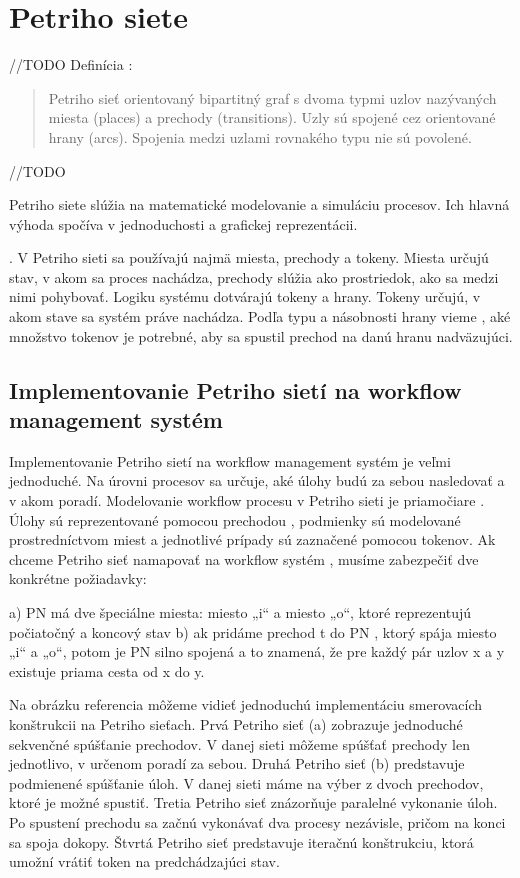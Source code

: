 \section{Petriho siete}

//TODO
Definícia \cite{workflow_systemy} :
\begin{quote}
	Petriho sieť orientovaný bipartitný graf s dvoma typmi uzlov nazývaných miesta (places) a prechody (transitions). Uzly sú spojené cez orientované hrany (arcs). Spojenia medzi uzlami rovnakého typu nie sú povolené.
\end{quote}
//TODO



Petriho siete slúžia na matematické modelovanie a simuláciu procesov. Ich hlavná výhoda spočíva v jednoduchosti a grafickej reprezentácii. 


.  V Petriho sieti sa používajú najmä miesta, prechody a tokeny. Miesta určujú stav, v akom sa proces nachádza, prechody slúžia ako prostriedok, ako sa medzi nimi pohybovať. Logiku systému dotvárajú tokeny a hrany. Tokeny určujú, v akom stave sa systém práve nachádza. Podľa typu a násobnosti hrany vieme ,  aké množstvo tokenov je potrebné, aby sa spustil prechod na danú hranu nadväzujúci.


\subsection{Implementovanie Petriho sietí na workflow management systém}
\label{kap:teoria_petriho_siete_na_workflow}

Implementovanie Petriho sietí na workflow management systém je veľmi jednoduché.
Na úrovni procesov sa určuje,  aké úlohy budú za sebou nasledovať a v akom poradí. Modelovanie workflow procesu v Petriho sieti je priamočiare . Úlohy sú reprezentované pomocou prechodou , podmienky sú modelované prostredníctvom  miest a jednotlivé prípady sú zaznačené pomocou tokenov.  Ak chceme Petriho sieť namapovať na workflow systém , musíme zabezpečiť dve konkrétne požiadavky:

a) PN má dve špeciálne miesta: miesto „i“ a miesto „o“, ktoré reprezentujú počiatočný a koncový stav
b) ak pridáme prechod t do PN , ktorý spája miesto „i“ a „o“, potom je PN silno spojená a to znamená, že pre každý pár uzlov x a y  existuje priama cesta od x do y. 

Na obrázku referencia môžeme vidieť jednoduchú implementáciu smerovacích konštrukcii na Petriho sieťach.
Prvá Petriho sieť (a) zobrazuje jednoduché sekvenčné spúšťanie prechodov. V danej sieti  môžeme spúšťať prechody len jednotlivo, v určenom poradí za sebou.
Druhá Petriho sieť (b) predstavuje podmienené spúšťanie úloh. V danej sieti máme na výber z dvoch prechodov, ktoré je možné spustiť.
Tretia Petriho sieť znázorňuje paralelné vykonanie úloh. Po spustení prechodu sa začnú vykonávať dva procesy nezávisle, pričom na konci sa spoja dokopy.
Štvrtá Petriho sieť predstavuje iteračnú konštrukciu, ktorá umožní vrátiť token na predchádzajúci stav.



